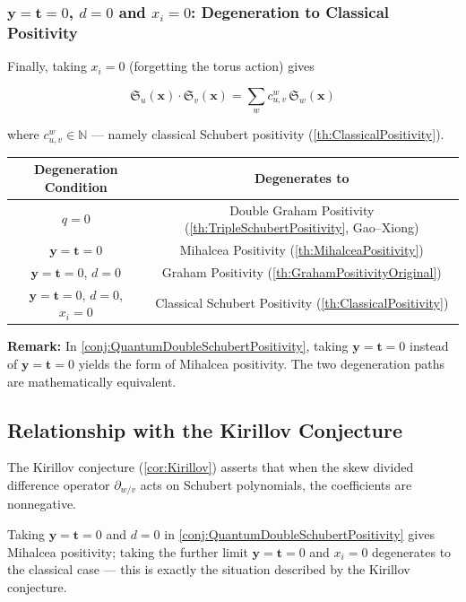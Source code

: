 \subsubsection{$\mathbf{y} = \mathbf{t} = 0$, $d = 0$ and $x_i = 0$: Degeneration to Classical Positivity}

Finally, taking $x_i = 0$ (forgetting the torus action) gives

$$\mathfrak{S}_u(\mathbf{x}) \cdot \mathfrak{S}_v(\mathbf{x}) = \sum_w c_{u,v}^w \, \mathfrak{S}_w(\mathbf{x})$$

where $c_{u,v}^w \in \mathbb{N}$ --- namely classical Schubert positivity (\cref{th:ClassicalPositivity}).

\begin{center}
\small
\begin{tabular}{c|c}
\hline
\textbf{Degeneration Condition} & \textbf{Degenerates to} \\ \hline
$q = 0$ & Double Graham Positivity (\cref{th:TripleSchubertPositivity}, Gao--Xiong)\\ \hline
$\mathbf{y} = \mathbf{t} = 0$ & Mihalcea Positivity (\cref{th:MihalceaPositivity})\\ \hline
$\mathbf{y} = \mathbf{t} = 0$, $d = 0$ & Graham Positivity (\cref{th:GrahamPositivityOriginal})\\ \hline
$\mathbf{y} = \mathbf{t} = 0$, $d = 0$, $x_i = 0$ & Classical Schubert Positivity (\cref{th:ClassicalPositivity})\\ \hline
\end{tabular}
\end{center}

\textbf{Remark:} In \cref{conj:QuantumDoubleSchubertPositivity}, taking $\mathbf{y} = \mathbf{t} = 0$ instead of $\mathbf{y} = \mathbf{t} = 0$ yields the form of Mihalcea positivity. The two degeneration paths are mathematically equivalent.

\subsection{Relationship with the Kirillov Conjecture}
\label{sec:RelationKirillovConjecture}

The Kirillov conjecture (\cref{cor:Kirillov}) asserts that when the skew divided difference operator $\partial_{w/v}$ acts on Schubert polynomials, the coefficients are nonnegative.

Taking $\mathbf{y} = \mathbf{t} = 0$ and $d = 0$ in \cref{conj:QuantumDoubleSchubertPositivity} gives Mihalcea positivity; taking the further limit $\mathbf{y} = \mathbf{t} = 0$ and $x_i = 0$ degenerates to the classical case --- this is exactly the situation described by the Kirillov conjecture.

